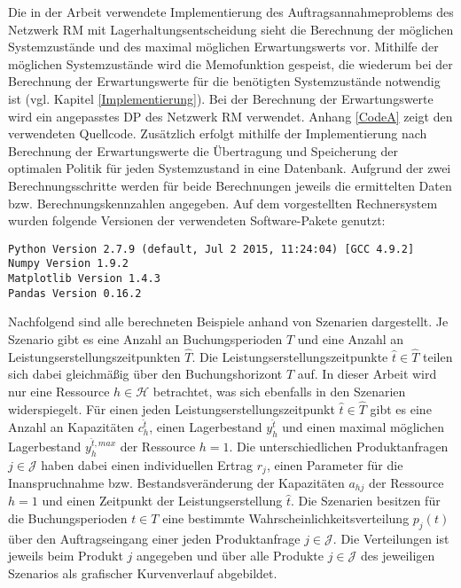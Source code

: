 Die in der Arbeit verwendete Implementierung des Auftragsannahmeproblems des Netzwerk RM mit Lagerhaltungsentscheidung sieht die Berechnung der möglichen Systemzustände und des maximal möglichen Erwartungswerts vor. Mithilfe der möglichen Systemzustände wird die Memofunktion gespeist, die wiederum bei der Berechnung der Erwartungswerte für die benötigten Systemzustände notwendig ist (vgl. Kapitel \ref{Implementierung}). Bei der Berechnung der Erwartungswerte wird ein  angepasstes DP des Netzwerk RM verwendet. Anhang \ref{CodeA} zeigt den verwendeten Quellcode. Zusätzlich erfolgt mithilfe der Implementierung nach Berechnung der Erwartungswerte die Übertragung und Speicherung der optimalen Politik für jeden Systemzustand in eine Datenbank. Aufgrund der zwei Berechnungsschritte werden für beide Berechnungen jeweils die ermittelten Daten bzw. Berechnungskennzahlen angegeben.  Auf dem vorgestellten Rechnersystem wurden folgende Versionen der verwendeten Software-Pakete genutzt:

\colorbox{hellgrau}{\parbox{14cm}{\texttt{Python Version 2.7.9 (default, Jul  2 2015, 11:24:04) [GCC 4.9.2]\\
Numpy Version 1.9.2\\
Matplotlib Version 1.4.3\\
Pandas Version 0.16.2
}}}

Nachfolgend sind alle berechneten Beispiele anhand von Szenarien dargestellt. Je Szenario gibt es eine Anzahl an Buchungsperioden $T$ und eine Anzahl an Leistungserstellungszeitpunkten $\hat T$. Die Leistungserstellungszeitpunkte $\hat t \in \hat T$ teilen sich dabei gleichmäßig über den Buchungshorizont $T$ auf. In dieser Arbeit wird nur eine Ressource $h\in\mathcal{H}$ betrachtet, was sich ebenfalls in den Szenarien widerspiegelt. Für einen jeden Leistungserstellungszeitpunkt $\hat t \in \hat T$ gibt es eine Anzahl an Kapazitäten $c_h^{\hat t}$, einen Lagerbestand $y_h^{\hat t}$ und einen maximal möglichen Lagerbestand $y_h^{{\hat t},max}$ der Ressource $h=1$. Die unterschiedlichen Produktanfragen $j\in\mathcal{J}$ haben dabei einen individuellen Ertrag $r_j$, einen Parameter für die Inanspruchnahme bzw. Bestandsveränderung der Kapazitäten $a_{hj}$ der Ressource $h=1$ und einen Zeitpunkt der Leistungserstellung $\hat t$. Die Szenarien besitzen für die Buchungsperioden $t\in T$ eine bestimmte Wahrscheinlichkeitsverteilung $p_j(t)$ über den Auftragseingang einer jeden Produktanfrage $j\in\mathcal{J}$. Die Verteilungen ist jeweils beim Produkt $j$ angegeben und über alle Produkte $j\in\mathcal{J}$ des jeweiligen Szenarios als grafischer Kurvenverlauf abgebildet.

